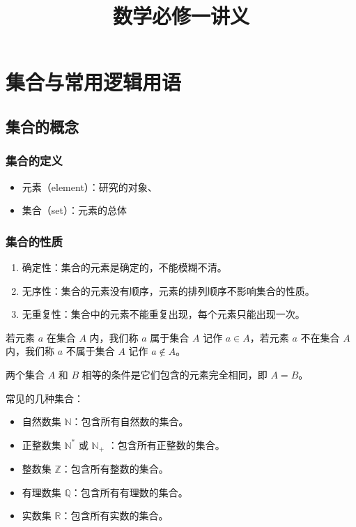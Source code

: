 \documentclass[lang = zh , final , oneside , openany , titlepage , zihao = -4 , linespread = 1.3 , baselineskip = false , cjk-font = macOS , text-font = newtx , math-font = newtx]{sjtureport}
\title{数学必修一讲义}
\begin{document}
\maketitle

\setcounter{page}{1}  %
\pagestyle{plain}     %
\tableofcontents


\newpage
\setcounter{page}{1}  %
\pagestyle{plain}     %
\chapter{集合与常用逻辑用语}
\section{集合的概念}
\subsection{集合的定义}

\begin{itemize}
    \item 元素（element）：研究的对象、
    \item 集合（set）：元素的总体
\end{itemize}

\subsection{集合的性质}

\begin{enumerate}
    \item 确定性：集合的元素是确定的，不能模糊不清。
    \item 无序性：集合的元素没有顺序，元素的排列顺序不影响集合的性质。
    \item 无重复性：集合中的元素不能重复出现，每个元素只能出现一次。
\end{enumerate}

若元素 $a$ 在集合 $A$ 内，我们称 $a$ 属于集合 $A$ 记作 $a \in A$，若元素 $a$ 不在集合 $A$ 内，我们称 $a$ 不属于集合 $A$ 记作 $a \notin A$。

两个集合 $A$ 和 $B$ 相等的条件是它们包含的元素完全相同，即 $A = B$。

\begin{remark}
    常见的几种集合：
    \begin{itemize}
        \item 自然数集 $\mathbb{N}$：包含所有自然数的集合。
        \item 正整数集 $\mathbb{N}^*$ 或 $\mathbb{N}_+$ ：包含所有正整数的集合。
        \item 整数集 $\mathbb{Z}$：包含所有整数的集合。
        \item 有理数集 $\mathbb{Q}$：包含所有有理数的集合。
        \item 实数集 $\mathbb{R}$：包含所有实数的集合。
    \end{itemize}
\end{remark}
\end{document}
